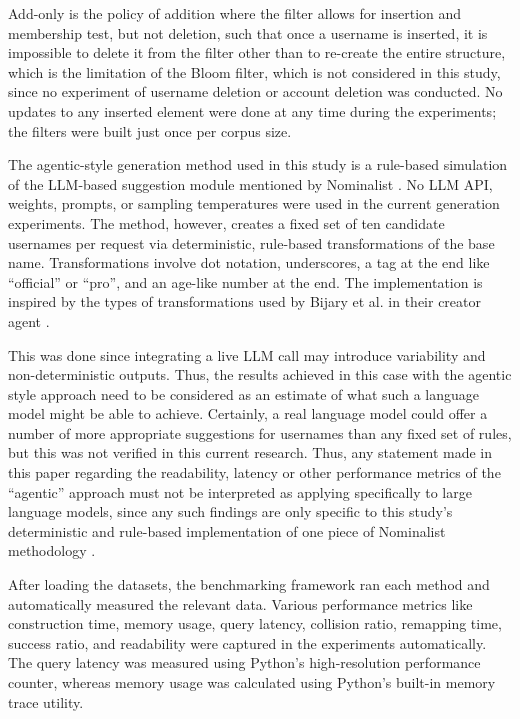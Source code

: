 \documentclass[conference]{IEEEtran}
\begin{document}
Add-only is the policy of addition where the filter allows for insertion and membership test, but not deletion, such that once a username is inserted, it is impossible to delete it from the filter other than to re-create the entire structure, which is the limitation of the Bloom filter, which is not considered in this study, since no experiment of username deletion or account deletion was conducted. No updates to any inserted element were done at any time during the experiments; the filters were built just once per corpus size.

The agentic-style generation method used in this study is a
rule-based simulation of the LLM-based suggestion module mentioned
by Nominalist \cite{b6}. No LLM API, weights, prompts, or sampling temperatures were used in the current generation experiments. The method, however, creates a fixed set of ten candidate usernames
per request via deterministic, rule-based transformations of the
base name. Transformations involve dot notation, underscores,
a tag at the end like ``official'' or ``pro'', and an
age-like number at the end. The implementation is inspired
by the types of transformations used by Bijary et al. in their creator
agent \cite{b6}. 

This was done since integrating a live LLM call may introduce variability
and non-deterministic outputs. Thus, the results achieved in this case with the agentic style approach need to be considered as an estimate of what such a language model might be able to achieve. Certainly, a real language model could offer a number of more appropriate
suggestions for usernames than any fixed set of rules, but this was not
verified in this current research. Thus, any statement made in this paper regarding the readability, latency or other performance metrics of the
``agentic'' approach must not be interpreted as applying specifically to large language models, since any such findings are only specific to this
study’s deterministic and rule-based implementation of one piece of Nominalist methodology \cite{b6}.

After loading the datasets, the benchmarking framework ran each method and automatically measured the relevant data. Various performance metrics like construction time, memory usage, query latency, collision ratio, remapping time, success ratio, and readability were captured in the experiments automatically. The query latency was measured using Python’s high-resolution performance counter, whereas memory usage was calculated using Python’s built-in memory trace utility.
\end{document}
